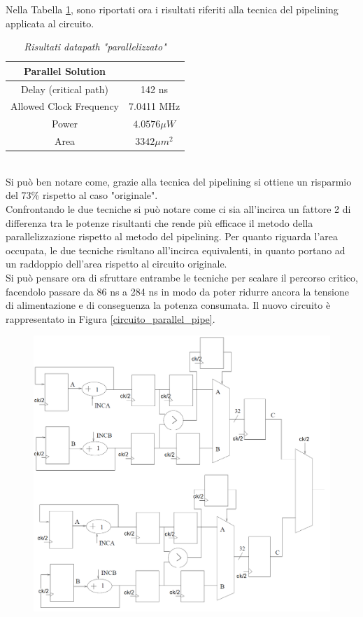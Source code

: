 {Nella Tabella \ref{Tab33_6}, sono riportati ora i risultati riferiti alla tecnica del pipelining applicata al circuito.
\begin{table}[!h]\footnotesize
	\centering
	\begin{tabular}{|c|c|}
		\hline
		\textbf{Parallel Solution} & \\
		\hline
		Delay (critical path) & 142 ns\\
		Allowed Clock Frequency & 7.0411 MHz\\
		Power & $4.0576\mu W$\\
		Area & $3342 \mu m^{2}$\\
		\hline
	\end{tabular}
	\caption{\textit{Risultati datapath "parallelizzato"}}
	\label{Tab33_6}
\end{table}\\
Si può ben notare come, grazie alla tecnica del pipelining si ottiene un risparmio del 73\% rispetto al caso "originale".\\ Confrontando le due tecniche si può notare come ci sia all'incirca un fattore 2 di differenza tra le potenze risultanti che rende più efficace il metodo della parallelizzazione rispetto al metodo del pipelining. Per quanto riguarda l'area occupata, le due tecniche risultano all'incirca equivalenti, in quanto portano ad un raddoppio dell'area rispetto al circuito originale.\\
Si può pensare ora di sfruttare entrambe le tecniche per scalare il percorso critico, facendolo passare da 86 ns a 284 ns in modo da poter ridurre ancora la tensione di alimentazione e di conseguenza la potenza consumata. Il nuovo circuito è rappresentato in Figura \ref{circuito_parallel_pipe}.
\begin{figure}[!htb]
	\centering
	\includegraphics[scale=0.8]{immagini/circuito_parallel_pipe}

\end{figure}}
